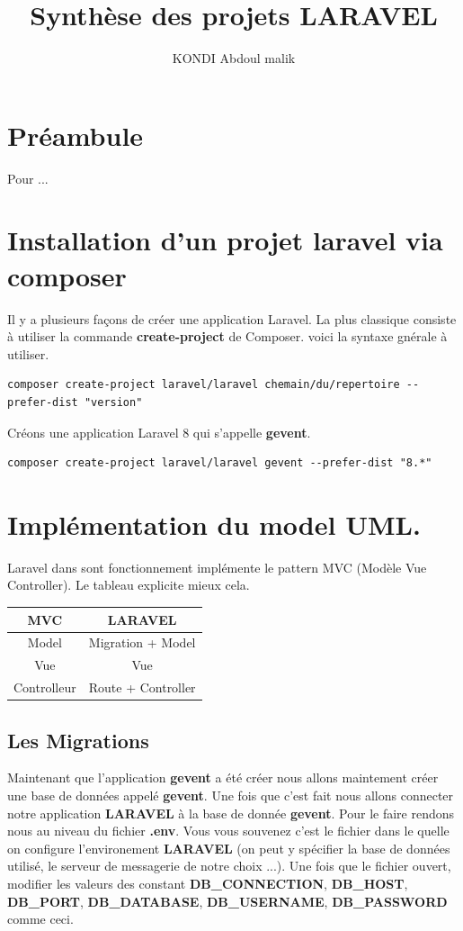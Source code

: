 \documentclass[12pt,a4paper]{article}
\author{KONDI Abdoul malik }
\title{Synthèse des projets LARAVEL}
\begin{document}
\maketitle
\tableofcontents
\newpage

\section{Préambule}
Pour ...

\newpage
\section{Installation d'un projet laravel via composer}
Il y a plusieurs façons de créer une application Laravel. La plus classique consiste à utiliser la commande 
\textbf{create-project} de Composer. voici la syntaxe gnérale à utiliser.
\begin{verbatim}
composer create-project laravel/laravel chemain/du/repertoire --prefer-dist "version"
\end{verbatim} 
Créons une application Laravel 8 qui s’appelle \textbf{gevent}.
\begin{verbatim}
composer create-project laravel/laravel gevent --prefer-dist "8.*"
\end{verbatim}

\section{Implémentation du model UML.}
Laravel dans sont fonctionnement implémente le pattern MVC (Modèle Vue Controller). Le tableau
explicite mieux cela.
\begin{center}
\begin{tabular}{|c|c|}
\hline 
MVC & LARAVEL \\ 
\hline 
Model & Migration + Model \\ 
\hline 
Vue & Vue \\ 
\hline 
Controlleur & Route + Controller \\ 
\hline 
\end{tabular} 
\end{center}
\subsection{Les Migrations}
Maintenant que l'application \textbf{gevent} a été créer nous allons maintement créer une base de données appelé \textbf{gevent}. Une fois que c'est fait nous allons connecter notre application \textbf{LARAVEL} à la base de donnée \textbf{gevent}. Pour le faire rendons nous au niveau du fichier
\textbf{.env}. Vous vous souvenez c'est le fichier dans le quelle on configure l'environement \textbf{LARAVEL} (on peut y spécifier la base de données utilisé, le serveur
de messagerie de notre choix ...). Une fois que le fichier ouvert, modifier les valeurs des
constant \textbf{DB\_CONNECTION}, \textbf{DB\_HOST}, \textbf{DB\_PORT}, \textbf{DB\_DATABASE}, \textbf{DB\_USERNAME}, \textbf{DB\_PASSWORD} comme ceci.
\end{document}
